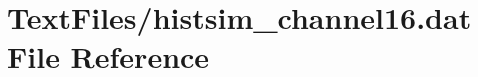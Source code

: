 \hypertarget{TextFiles_2histsim__channel16_8dat}{}\section{Text\+Files/histsim\+\_\+channel16.dat File Reference}
\label{TextFiles_2histsim__channel16_8dat}

